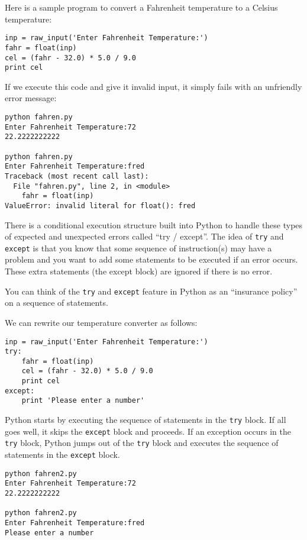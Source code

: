 Here is a sample program to convert a Fahrenheit temperature 
to a Celsius temperature:

\beforeverb
\begin{verbatim}
inp = raw_input('Enter Fahrenheit Temperature:')
fahr = float(inp)
cel = (fahr - 32.0) * 5.0 / 9.0
print cel
\end{verbatim}
\afterverb
%
If we execute this code and give it invalid input, it simply fails
with an unfriendly error message:

\beforeverb
\begin{verbatim}
python fahren.py 
Enter Fahrenheit Temperature:72
22.2222222222

python fahren.py 
Enter Fahrenheit Temperature:fred
Traceback (most recent call last):
  File "fahren.py", line 2, in <module>
    fahr = float(inp)
ValueError: invalid literal for float(): fred
\end{verbatim}
\afterverb
%
There is a conditional execution structure built into 
Python to handle these types of expected and unexpected
errors called ``try / except''.  The idea of {\tt try}
and {\tt except} is that you know that some sequence
of instruction(s) may have a problem and you want to 
add some statements to be executed if an error occurs.
These extra statements (the except block) are ignored
if there is no error.

You can think of the {\tt try} and {\tt except} feature
in Python as an ``insurance policy'' on a sequence of
statements.

We can rewrite our temperature converter as follows:

\beforeverb
\begin{verbatim}
inp = raw_input('Enter Fahrenheit Temperature:')
try:
    fahr = float(inp)
    cel = (fahr - 32.0) * 5.0 / 9.0
    print cel
except:
    print 'Please enter a number'
\end{verbatim}
\afterverb
%

Python starts by executing the 
sequence of statements in the 
{\tt try} block.  If all goes
well, it skips the {\tt except} block and proceeds.  If an
exception occurs in the {\tt try} block, 
Python jumps out of the {\tt try} block and
executes the sequence of statements in the {\tt except} block.

\beforeverb
\begin{verbatim}
python fahren2.py 
Enter Fahrenheit Temperature:72
22.2222222222

python fahren2.py 
Enter Fahrenheit Temperature:fred
Please enter a number
\end{verbatim}
\afterverb
%

